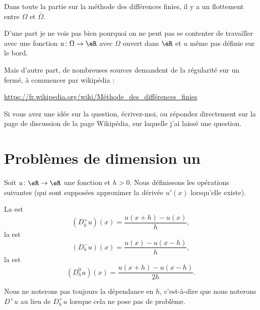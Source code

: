 
\begin{probleme}
	Dans toute la partie sur la méthode des différences finies, il y a un flottement entre \( \Omega\) et \( \bar \Omega\).

	D'une part je ne vois pas bien pourquoi on ne peut pas se contenter de travailler avec une fonction \( u\colon \Omega\to \eR\) avec \( \Omega\) ouvert dans \( \eR\) et \( u\) même pas définie sur le bord.

	Mais d'autre part, de nombreuses sources demandent de la régularité sur un fermé, à commencer par wikipédia :

	\url{https://fr.wikipedia.org/wiki/Méthode_des_différences_finies}

	Si vous avez une idée sur la question, écrivez-moi, ou répondez directement sur la page de discussion de la page Wikipédia, sur laquelle j'ai laissé une question.
\end{probleme}

\section{Problèmes de dimension un}

Soit \( u\colon \eR\to \eR\) une fonction et \( h>0\). Nous définissons les opérations suivantes (qui sont supposées approximer la dérivée \( u'(x)\) lorsqu'elle existe).

\begin{definition}
	La  est
	\begin{equation}
		(D^+_hu)(x)=\frac{ u(x+h)-u(x) }{ h },
	\end{equation}
	la  est
	\begin{equation}
		(D^-_hu)(x)=\frac{ u(x)-u(x-h) }{ h },
	\end{equation}
	la  est
	\begin{equation}
		(D^0_hu)(x)=\frac{ u(x+h)-u(x-h) }{ 2h }.
	\end{equation}
\end{definition}
Nous ne noterons pas toujours la dépendance en \( h\), c'est-à-dire que nous noterons \( D^+u\) au lieu de \( D^+_hu\) lorsque cela ne pose pas de problème.

